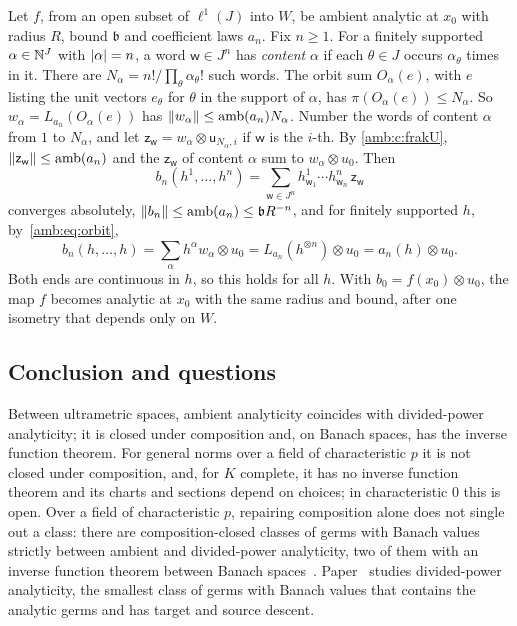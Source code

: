 \begin{remark}
Let $f$, from an open subset of $\ell^1(J)$ into $W$, be ambient analytic at $x_0$ with radius $R$, bound $\mathfrak b$ and coefficient laws $a_n$. Fix $n\ge1$. For a finitely supported $\alpha\in\mathbb N^J$ with $\lvert \alpha\rvert=n$, a word $\mathsf w\in J^n$ has \emph{content} $\alpha$ if each $\theta\in J$ occurs $\alpha_\theta$ times in it. There are $N_\alpha=n!/\prod_\theta\alpha_\theta!$ such words. The orbit sum $O_\alpha(e)$, with $e$ listing the unit vectors $e_\theta$ for $\theta$ in the support of $\alpha$, has $\pi(O_\alpha(e))\le N_\alpha$. So $w_\alpha=L_{a_n}(O_\alpha(e))$ has $\lVert w_\alpha\rVert\le\operatorname{amb}(a_n)N_\alpha$. Number the words of content $\alpha$ from $1$ to $N_\alpha$, and let $\mathsf z_{\mathsf w}=w_\alpha\otimes\mathsf u_{N_\alpha,i}$ if $\mathsf w$ is the $i$-th. By \eqref{amb:c:frakU}, $\lVert \mathsf z_{\mathsf w}\rVert\le\operatorname{amb}(a_n)$ and the $\mathsf z_{\mathsf w}$ of content $\alpha$ sum to $w_\alpha\otimes u_0$. Then
\[
 b_n(h^1,\dots,h^n)=\sum_{\mathsf w\in J^n}h^1_{\mathsf w_1}\cdots h^n_{\mathsf w_n}\,\mathsf z_{\mathsf w}
\]
converges absolutely, $\lVert b_n\rVert\le\operatorname{amb}(a_n)\le \mathfrak bR^{-n}$, and for finitely supported $h$, by~\eqref{amb:eq:orbit},
\[
 b_n(h,\dots,h)=\sum_\alpha h^\alpha w_\alpha\otimes u_0=L_{a_n}(h^{\otimes n})\otimes u_0=a_n(h)\otimes u_0.
\]
Both ends are continuous in $h$, so this holds for all $h$. With $b_0=f(x_0)\otimes u_0$, the map $f$ becomes analytic at $x_0$ with the same radius and bound, after one isometry that depends only on $W$.
\end{remark}

\subsection{Conclusion and questions}\label{amb:ssec:end}

Between ultrametric spaces, ambient analyticity coincides with divided-power analyticity; it is closed under composition and, on Banach spaces, has the inverse function theorem. For general norms over a field of characteristic $p$ it is not closed under composition, and, for $K$ complete, it has no inverse function theorem and its charts and sections depend on choices; in characteristic $0$ this is open. Over a field of characteristic $p$, repairing composition alone does not single out a class: there are composition-closed classes of germs with Banach values strictly between ambient and divided-power analyticity, two of them with an inverse function theorem between Banach spaces~\cite{II}. Paper~\cite{II} studies divided-power analyticity, the smallest class of germs with Banach values that contains the analytic germs and has target and source descent.

